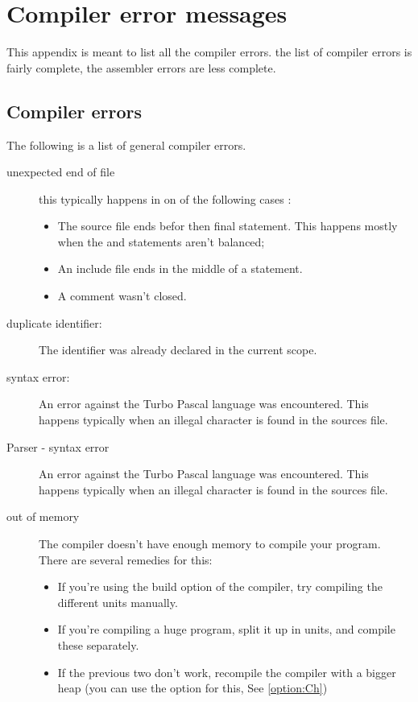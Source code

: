 \documentclass{report}
\newcommand{\seeo}[1]{See \ref{option:#1}}
\begin{document}
\chapter{Compiler error messages}
\label{ch:ErrorMessages}
This appendix is meant to list all the compiler errors. the list of compiler
errors is fairly complete, the assembler errors are less complete.

\section{Compiler errors}
The following is a list of general compiler errors. 
\begin{description}
\item [unexpected end of file]
this typically happens in on of the following cases :
\begin{itemize}
\item The source file ends befor then final  statement. This
happens mostly when the  and  statements aren't
balanced;
\item An include file ends in the middle of a statement.
\item A comment wasn't closed.
\end{itemize}
\item [duplicate identifier:]
The identifier was already declared in the current scope.
\item [syntax error:]
An error against the Turbo Pascal language was encountered. This happens
typically when an illegal character is found in the sources file.
\item [Parser - syntax error] 
An error against the Turbo Pascal language was encountered. This happens
typically when an illegal character is found in the sources file.
\item [out of memory]
The compiler doesn't have enough memory to compile your program. There are
several remedies for this:
\begin{itemize}
\item If you're using the build option of the compiler, try compiling the
different units manually.
\item If you're compiling a huge program, split it up in units, and compile
these separately.
\item If the previous two don't work, recompile the compiler with a bigger
heap (you can use the  option for this, \seeo{Ch})
\end{itemize} 

\end{description}
\end{document}
